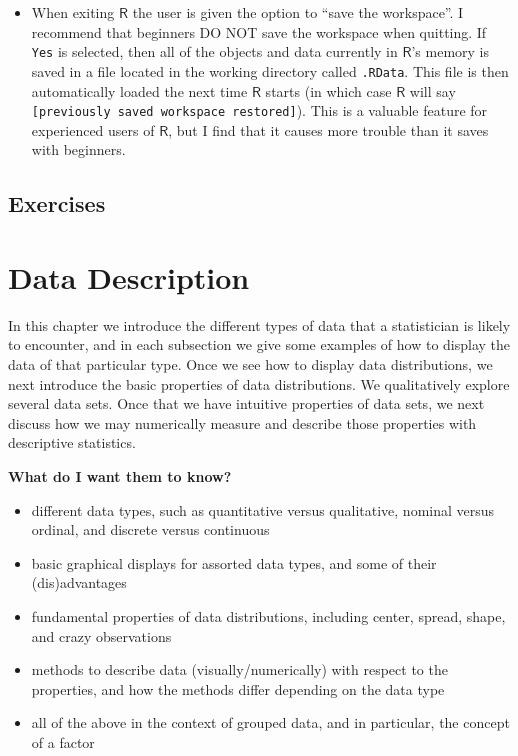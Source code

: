 \documentclass[captions=tableheading]{scrbook}
\begin{document}
\begin{itemize}
\item When exiting \(\mathsf{R}\) the user is given the option to ``save the workspace''. I recommend that beginners DO NOT save the workspace when quitting. If \texttt{Yes} is selected, then all of the objects and data currently in \(\mathsf{R}\)'s memory is saved in a file located in the working directory called \texttt{.RData}. This file is then automatically loaded the next time \(\mathsf{R}\) starts (in which case \(\mathsf{R}\) will say \texttt{[previously saved workspace restored]}). This is a valuable feature for experienced users of \(\mathsf{R}\), but I find that it causes more trouble than it saves with beginners.
\end{itemize}

\newpage{}
\section{Exercises}
\label{sec-2-7}

\setcounter{thm}{0}
\chapter{Data Description}
\label{sec-3}
\label{cha-Describing-Data-Distributions}


\noindent 
In this chapter we introduce the different types of data that a statistician is likely to encounter, and in each subsection we give some examples of how to display the data of that particular type. Once we see how to display data distributions, we next introduce the basic properties of data distributions. We qualitatively explore several data sets. Once that we have intuitive properties of data sets, we next discuss how we may numerically measure and describe those properties with descriptive statistics.

 \textbf{What do I want them to know?}

\begin{itemize}
\item different data types, such as quantitative versus qualitative, nominal versus ordinal, and discrete versus continuous
\item basic graphical displays for assorted data types, and some of their (dis)advantages
\item fundamental properties of data distributions, including center, spread, shape, and crazy observations
\item methods to describe data (visually/numerically) with respect to the properties, and how the methods differ depending on the data type
\item all of the above in the context of grouped data, and in particular, the concept of a factor
\end{itemize}
\end{document}
